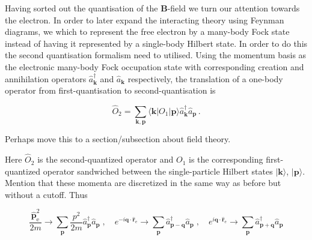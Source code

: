 \documentclass[12pt]{report}
\renewcommand{\vec}[1]{\boldsymbol{\mathbf{#1}}}                        %
\newcommand{\todo}[1]{{\leavevmode\color{todo}#1}}
\begin{document}
Having sorted out the quantisation of the $ \vec B $-field we turn our attention towards the electron. In order to later expand the interacting theory using Feynman diagrams, we which to represent the free electron by a many-body Fock state instead of having it represented by a single-body Hilbert state. In order to do this the second quantisation formalism need to utilised. Using the momentum basis as the electronic many-body Fock occupation state with corresponding creation and annihilation operators $ \hat a^\dagger_{\vec k} $ and $ \hat a_{\vec k} $ respectively, the translation of a one-body operator from first-quantisation to second-quantisation is\cite{quantumTheoryOfManyParticleSystems}

\begin{equation}
	\hat O_2 = \sum_{\vec k, \vec p} \langle \vec k | O_1 | \vec p \rangle \hat a^\dagger_{\vec k} \hat a_{\vec p} \,.
\end{equation}

\todo{Perhaps move this to a section/subsection about field theory.}

Here $ \hat O_2 $ is the second-quantized operator and $ O_1 $ is the corresponding first-quantized operator sandwiched between the single-particle Hilbert states $ | \vec k \rangle $, $ | \vec p \rangle $. \todo{Mention that these momenta are discretized in the same way as before but without a cutoff}. Thus

\begin{equation}
	\frac{\hat{\vec p}_\text{e}^2}{2m} \rightarrow \sum_{\vec p} \frac{p^2}{2m} \hat a^\dagger_{\vec p} \hat a_{\vec p}
	\; , \quad
	e^{-i \vec q \cdot \hat{ \vec r}_\text{e}} \rightarrow \sum_{\vec p} \hat a^\dagger_{\vec p - \vec q} \hat a_{\vec p}
	\; , \quad
	e^{i \vec q \cdot \hat{ \vec r}_\text{e}} \rightarrow \sum_{\vec p} \hat a^\dagger_{\vec p + \vec q} \hat a_{\vec p}
\end{equation}
\end{document}
